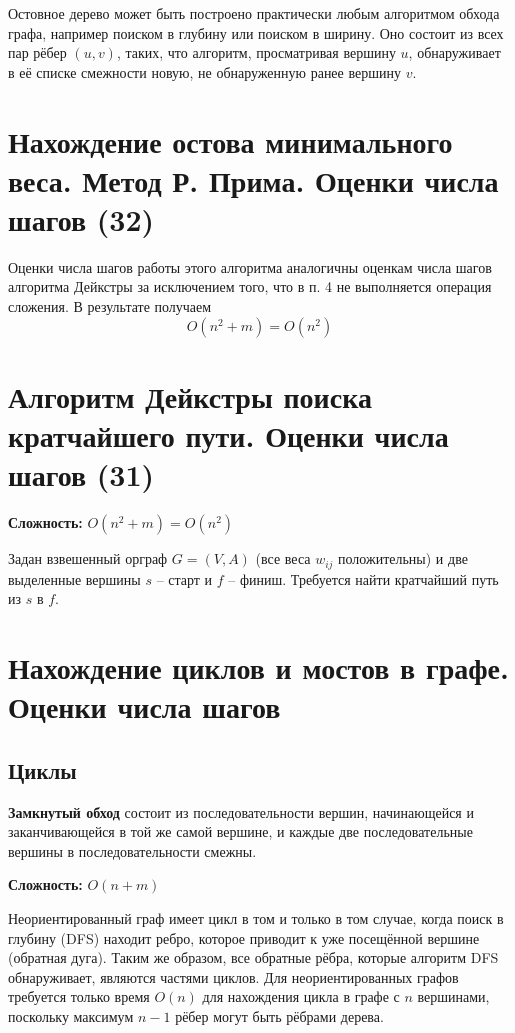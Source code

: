 \documentclass[40pt]{article}
\begin{document}
Остовное дерево может быть построено практически любым алгоритмом обхода графа, например поиском в глубину или поиском в ширину. Оно состоит из всех пар рёбер $(u, v)$, таких, что алгоритм, просматривая вершину $u$, обнаруживает в её списке смежности новую, не обнаруженную ранее вершину $v$.



\section{Нахождение остова минимального веса. Метод Р. Прима. Оценки числа шагов (32)}

Оценки числа шагов работы этого алгоритма аналогичны оценкам числа шагов алгоритма Дейкстры за исключением того, что в п. 4 не выполняется операция сложения. В результате получаем
$$ O\left(n^{2}+m\right)=O\left(n^{2}\right) $$



\section{Алгоритм Дейкстры поиска кратчайшего пути. Оценки числа шагов (31)}

\textbf{Сложность: } $O(n^2 + m) = O(n^2)$

Задан взвешенный орграф $G=(V, A)$ (все веса $w_{i j}$ положительны) и две выделенные вершины $s$ -- старт и $f$ -- финиш. Требуется найти кратчайший путь из $s$ в $f$.


\section{Нахождение циклов и мостов в графе. Оценки числа шагов}

\subsection{Циклы}

\textbf{Замкнутый обход} состоит из последовательности вершин, начинающейся и заканчивающейся в той же самой вершине, и каждые две последовательные вершины в последовательности смежны.

\textbf{Сложность: } $O(n + m)$

Неориентированный граф имеет цикл в том и только в том случае, когда поиск в глубину (DFS) находит ребро, которое приводит к уже посещённой вершине (обратная дуга). Таким же образом, все обратные рёбра, которые алгоритм DFS обнаруживает, являются частями циклов. Для неориентированных графов требуется только время $O(n)$ для нахождения цикла в графе с $n$ вершинами, поскольку максимум $n-1$ рёбер могут быть рёбрами дерева.
\end{document}
